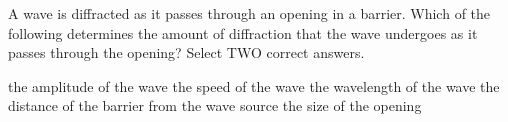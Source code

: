 \documentclass[answers]{exam}
\begin{document}
\begin{questions}






\question
A wave is diffracted as it passes through an opening in a barrier. Which of the following determines the amount of diffraction that the wave undergoes as it passes through the opening? Select TWO correct answers.

\begin{randomizechoices}
    \choice the amplitude of the wave
    \choice the speed of the wave
    \correctchoice the wavelength of the wave
    \choice the distance of the barrier from the wave source
    \correctchoice the size of the opening
\end{randomizechoices}


\end{questions}
\end{document}
